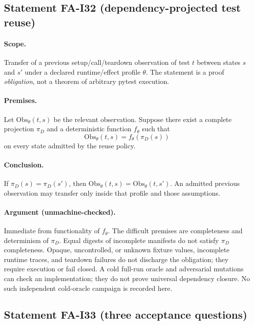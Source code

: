 \subsection*{Statement FA-I32 (dependency-projected test reuse)}
\label{stmt:fa-i32}

\paragraph{Scope.}
Transfer of a previous setup/call/teardown observation of test $t$ between
states $s$ and $s'$ under a declared runtime/effect profile $\theta$. The
statement is a proof \emph{obligation}, not a theorem of arbitrary pytest
execution.

\paragraph{Premises.}
Let $\mathrm{Obs}_{\theta}(t,s)$ be the relevant observation. Suppose there exist
a complete projection $\pi_D$ and a deterministic function $f_{\theta}$ such that
\[
\mathrm{Obs}_{\theta}(t,s)=f_{\theta}(\pi_D(s))
\]
on every state admitted by the reuse policy.

\paragraph{Conclusion.}
If $\pi_D(s)=\pi_D(s')$, then $\mathrm{Obs}_{\theta}(t,s)=\mathrm{Obs}_{\theta}(t,s')$.
An admitted previous observation may transfer only inside that profile and those
assumptions.

\paragraph{Argument (unmachine-checked).}
Immediate from functionality of $f_{\theta}$. The difficult premises are
completeness and determinism of $\pi_D$. Equal digests of incomplete manifests
do not satisfy $\pi_D$ completeness. Opaque, uncontrolled, or unknown fixture
values, incomplete runtime traces, and teardown failures do not discharge the
obligation; they require execution or fail closed. A cold full-run oracle and
adversarial mutations can check an implementation; they do not prove universal
dependency closure. No such independent cold-oracle campaign is recorded here.

\subsection*{Statement FA-I33 (three acceptance questions)}
\label{stmt:fa-i33}

